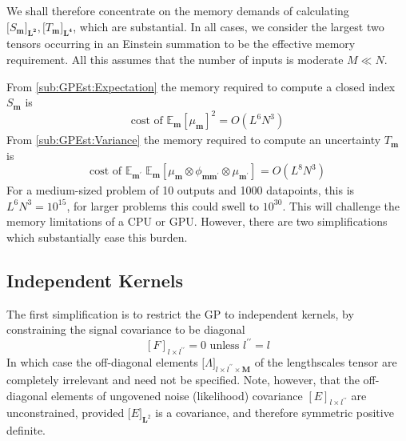 \documentclass[preprint,12pt]{elsarticle}
\newcommand*{\x}{\times}
\newcommand*{\mi}[1]{\mathbf{#1}}
\newcommand*{\te}[2][]{\left\lbrack{#2}\right\rbrack_{#1}}
\newcommand*{\tte}[2][]{\lbrack{#2}\rbrack_{#1}}
\newcommand{\T}[1]{\text{#1}}
\newcommand*{\evt}[3][]{\mathbb{E}_{#3}^{#1}\!#2}
\begin{document}
    We shall therefore concentrate on the memory demands of calculating $\tte[\mi{L^{2}}]{S_{\mi{m}}},\tte[\mi{L^{4}}]{T_{\mi{m}}}$, which are substantial. In all cases, we consider the largest two tensors occurring in an Einstein summation to be the effective memory requirement. All this assumes that the number of inputs is moderate $M \ll N$.

    From \cref{sub:GPEst:Expectation} the memory required to compute a closed index $S_{\mi{m}}$ is
    \begin{equation*}
        \T{cost of }\evt{\te[]{\mu_{\mi{m}}}^{2}}{\mi{m}} = O(L^{6}N^{3})
    \end{equation*}
    From \cref{sub:GPEst:Variance} the memory required to compute an uncertainty $T_{\mi{m}}$ is
    \begin{equation*}
        \T{cost of }\evt{\;\evt{\te[]{\mu_{\mi{m}} \otimes \phi_{\mi{mm^{\prime}}} \otimes \mu_{\mi{m^{\prime}}}}}}{\mi{m^{\prime}}}{\mi{m}} = O(L^{8}N^{3})
    \end{equation*}
    For a medium-sized problem of 10 outputs and 1000 datapoints, this is $L^{6}N^{3}=10^{15}$, for larger problems this could swell to $10^{30}$. This will challenge the memory limitations of a CPU or GPU. However, there are two simplifications which substantially ease this burden.

    \subsection{Independent Kernels}\label{sub:Complexity:Indep}
    The first simplification is to restrict the GP to independent kernels, by constraining the signal covariance to be diagonal 
    \begin{equation*}
        \te[l\x l^{\prime\prime}]{F} = 0 \T{ unless } l^{\prime\prime} = l
    \end{equation*}
    In which case the off-diagonal elements $\tte[l\x l^{\prime\prime}\x\mi{M}]{\Lambda}$ of the lengthscales tensor are completely irrelevant and need not be specified. Note, however, that the off-diagonal elements of ungovened noise (likelihood) covariance $\te[l\x l^{\prime\prime}]{E}$ are unconstrained, provided $\tte[\mi{L}^{2}]{E}$ is a covariance, and therefore symmetric positive definite.
\end{document}

